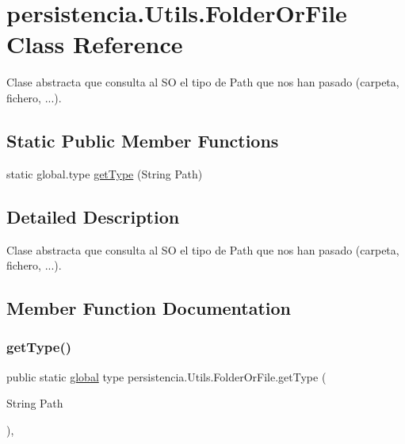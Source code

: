 \hypertarget{classpersistencia_1_1Utils_1_1FolderOrFile}{}\section{persistencia.\+Utils.\+Folder\+Or\+File Class Reference}
\label{classpersistencia_1_1Utils_1_1FolderOrFile}


Clase abstracta que consulta al SO el tipo de Path que nos han pasado (carpeta, fichero, ...).  


\subsection*{Static Public Member Functions}
\begin{DoxyCompactItemize}
\item 
static global.\+type \hyperlink{classpersistencia_1_1Utils_1_1FolderOrFile_a57af4d14d71521f8a9b2b1aaad891fb0}{get\+Type} (String Path)
\end{DoxyCompactItemize}


\subsection{Detailed Description}
Clase abstracta que consulta al SO el tipo de Path que nos han pasado (carpeta, fichero, ...). 

\subsection{Member Function Documentation}
\mbox{\label{classpersistencia_1_1Utils_1_1FolderOrFile_a57af4d14d71521f8a9b2b1aaad891fb0}} 
\subsubsection{\texorpdfstring{get\+Type()}{getType()}}
{\footnotesize\ttfamily public static \hyperlink{classglobal_1_1global}{global} type persistencia.\+Utils.\+Folder\+Or\+File.\+get\+Type (\begin{DoxyParamCaption}\item[{String}]{Path }\end{DoxyParamCaption})\hspace{0.3cm}{\ttfamily [inline]}, {\ttfamily [static]}}


